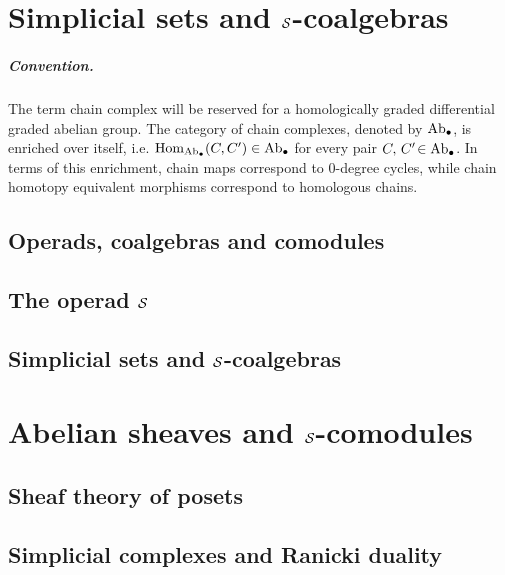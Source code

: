 \documentclass[12pt,oneside]{book}
\begin{document}
\thispagestyle{plain}

  \chapter{Simplicial sets and $\S$-coalgebras}

    \paragraph{Convention.}\hspace*{-8pt}The term chain complex will be reserved for a homologically graded differential graded abelian group. The category of chain complexes, denoted by $\Ab_\bullet$, is enriched over itself, i.e. $\Hom_{\Ab_\bullet}(C,C')\in\Ab_\bullet$ for every pair $C,\,C'\!\in\Ab_\bullet$. In terms of this enrichment, chain maps correspond to $0$-degree cycles, while chain homotopy equivalent morphisms correspond to homologous chains.

    \section{Operads, coalgebras and comodules}
    

    \section{The operad $\S$}
    

    \section{Simplicial sets and $\S$-coalgebras}
    

  \chapter{Abelian sheaves and $\S$-comodules}

    \section{Sheaf theory of posets}
    

    \section{Simplicial complexes and Ranicki duality}
    
\end{document}
